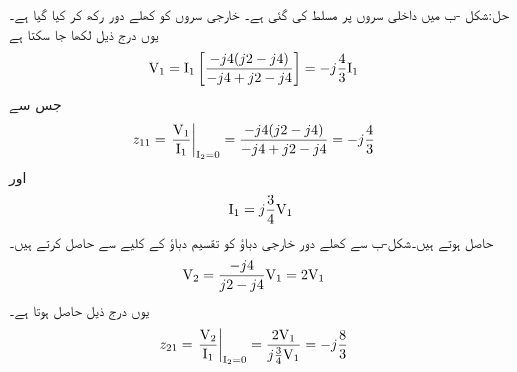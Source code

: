 حل:شکل -ب میں داخلی سروں پر  مسلط کی گئی ہے۔ خارجی سروں کو کھلے دور رکھ کر  کیا گیا ہے۔یوں درج ذیل لکھا جا سکتا ہے
\begin{align*}
{\ensuremath{{\textup{V}}}}_1&={{\textup{I}}}_1\left[\frac{-j4(j2-j4)}{-j4+j2-j4}\right]=-j\frac{4}{3}{{\textup{I}}}_1
\end{align*}
جس سے
\begin{align*}
z_{11}&=\left. \frac{{{\textup{V}}}_1}{{{\textup{I}}}_1}\right|_{{{\textup{I}}}_2=0}=\frac{-j4(j2-j4)}{-j4+j2-j4}=-j\frac{4}{3}
\end{align*}
اور
\begin{align*}
{\ensuremath{{\textup{I}}}}_1=j\frac{3}{4}{{\textup{V}}}_1
\end{align*}
حاصل ہوتے ہیں۔شکل-ب سے کھلے دور خارجی دباؤ کو تقسیم دباؤ کے کلیے سے حاصل کرتے ہیں۔
\begin{align*}
{\ensuremath{{\textup{V}}}}_2&=\frac{-j4}{j2-j4}{{\textup{V}}}_1=2{{\textup{V}}}_1
\end{align*}
یوں درج ذیل حاصل ہوتا ہے۔
\begin{align*}
z_{21}&=\left. \frac{{{\textup{V}}}_2}{{{\textup{I}}}_1}\right|_{{{\textup{I}}}_2=0}=\frac{2{{\textup{V}}}_1}{j\frac{3}{4}{{\textup{V}}}_1}=-j\frac{8}{3}
\end{align*}

